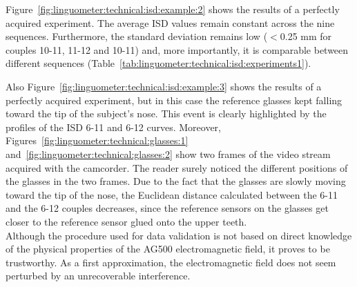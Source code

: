 
Figure~\ref{fig:linguometer:technical:isd:example:2} shows the results of a
perfectly acquired experiment.
The average ISD values remain constant across the nine sequences. Furthermore,
the standard deviation remains low ($<$0.25 mm for couples 10-11, 11-12 and 
10-11) and, more importantly, it is comparable between different 
sequences (Table~\ref{tab:linguometer:technical:isd:experiments1}).

Also Figure~\ref{fig:linguometer:technical:isd:example:3} shows the 
results of a perfectly acquired experiment, but in this case the reference
glasses kept falling toward the tip of the subject's nose.
This event is clearly highlighted by the profiles of the ISD 6-11 and 6-12
curves.
Moreover, Figures~\ref{fig:linguometer:technical:glasses:1}
and~\ref{fig:linguometer:technical:glasses:2} show two frames of the video
stream acquired with the camcorder. 
The reader surely noticed the different positions of the glasses in the two
frames. Due to the fact that the glasses are slowly moving toward the tip of 
the nose, the Euclidean distance calculated between the 6-11 and
the 6-12 couples decreases, since the reference sensors on the glasses get 
closer to the reference sensor glued onto the upper teeth.\\

Although the procedure used for data validation is not based on direct 
knowledge of the physical properties of the AG500 electromagnetic field, it 
proves to be trustworthy.
As a first approximation, the electromagnetic field does not seem perturbed 
by an unrecoverable interference.
%
%
